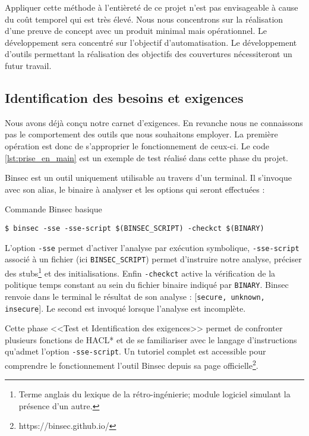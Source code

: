 Appliquer cette méthode à l'entièreté de ce projet n'est pas envisageable à cause du coût temporel qui est très élevé. Nous nous concentrons sur la réalisation d'une preuve de concept avec un produit minimal mais opérationnel. Le développement sera concentré sur l'objectif d'automatisation. Le développement d'outils permettant la réalisation des objectifs des couvertures  nécessiteront un futur travail.

\subsection*{Identification des besoins et exigences}

Nous avons déjà conçu notre carnet d'exigences. En revanche nous ne connaissons pas le comportement des outils que nous souhaitons employer. La première opération est donc de s'approprier le fonctionnement de ceux-ci. Le code \ref{lst:prise_en_main} est un exemple de test réalisé dans cette phase du projet.

Binsec est un outil uniquement utilisable au travers d'un terminal. Il s'invoque avec son alias, le binaire à analyser et les options qui seront effectuées :

\begin{listing}[!ht]
    \caption{Commande Binsec basique}
    \label{lst:commande_binsec}
    \begin{verbatim}
$ binsec -sse -sse-script $(BINSEC_SCRIPT) -checkct $(BINARY)
    \end{verbatim}
\end{listing}

L'option \texttt{-sse} permet d'activer l'analyse par exécution symbolique, \texttt{-sse-script} associé à un fichier (ici \texttt{BINSEC\_SCRIPT}) permet d'instruire notre analyse, préciser des stubs\footnote{Terme anglais du lexique de la rétro-ingénierie; module logiciel simulant la présence d'un autre.} et des initialisations. Enfin \texttt{-checkct} active la vérification de la politique temps constant au sein du fichier binaire indiqué par \texttt{BINARY}. Binsec renvoie dans le terminal le résultat de son analyse : [\texttt{secure, unknown, insecure}]. Le second est invoqué lorsque l'analyse est incomplète.\medbreak

Cette phase <<Test et Identification des exigences>> permet de confronter plusieurs fonctions de HACL* et de se familiariser avec le langage d'instructions qu'admet l'option \texttt{-sse-script}. Un tutoriel complet est accessible pour comprendre le fonctionnement l'outil Binsec depuis sa page officielle\footnote{https://binsec.github.io/}.

